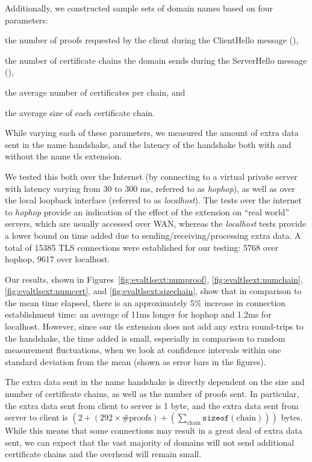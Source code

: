 Additionally, we constructed sample sets of domain names based on four parameters:
\begin{inparaenum}
\item the number of proofs requested by the client during the
  ClientHello message (\numlas),
\item the number of certificate chains the domain sends during the ServerHello
  message (\policy),
\item the average number of certificates per chain, and
\item the average size of each certificate chain.
\end{inparaenum}
While varying each of these parameters, we measured the amount of extra data
sent in the \ac{name} handshake, and the latency of the handshake both with and
without the \ac{name} \ac{tls} extension.

We tested this both over the Internet (by connecting to a virtual private server
with latency varying from 30 to 300 ms, referred to as \emph{hophop}), as well
as over the local loopback interface (referred to as \emph{localhost}). The
tests over the internet to \emph{hophop} provide an indication of the effect of
the extension on ``real world'' servers, which are usually accessed over WAN,
whereas the \emph{localhost} tests provide a lower bound on time added due to
sending/receiving/processing extra data. A total of 15385 TLS connections were
established for our testing: 5768 over hophop, 9617 over localhost.

Our results, shown in Figures~\ref{fig:evaltlsext:numproof},
\ref{fig:evaltlsext:numchain}, \ref{fig:evaltlsext:numcert}, and
\ref{fig:evaltlsext:sizechain}, show that in comparison to the mean time
elapsed, there is an approximately 5\% increase in connection establishment
time: an average of 11ms longer for hophop and 1.2ms for localhost. However,
since our \ac{tls} extension does not add any extra round-trips to the
handshake, the time added is small, especially in comparison to random
measurement fluctuations, when we look at confidence intervals within one
standard deviation from the mean (shown as error bars in the figures).

The extra data sent in the \ac{name} handshake is directly dependent on the size
and number of certificate chains, as well as the number of proofs sent. In
particular, the extra data sent from client to server is 1 byte, and the extra
data sent from server to client is
$(2 + (292 \times \text{\#proofs}) +
(\sum_{\text{chain}}\texttt{sizeof}(\text{chain})))$ bytes. While this means
that some connections may result in a great deal of extra data sent, we can
expect that the vast majority of domains will not send additional certificate
chains and the overhead will remain small.